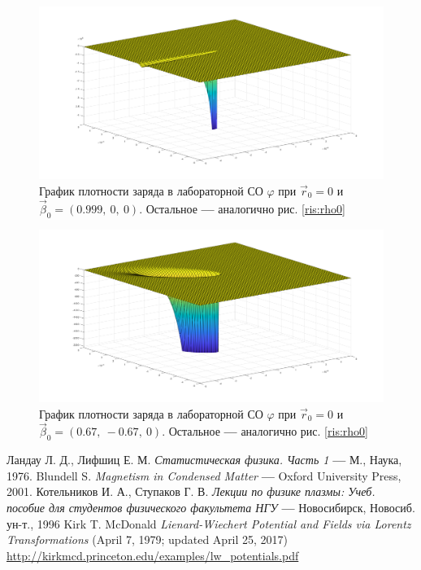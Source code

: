 \documentclass[oneside,final,14pt]{extarticle}
\begin{document}
	\begin{figure}
		\centering
		\includegraphics[scale=0.36]{spd0999orig.png}
		\caption{График плотности заряда в лабораторной СО $\varphi$ при $\vec r_{0}=0$ и $\vec \beta_0 = (0.999, \ 0, \ 0)$. Остальное \textbf{---} аналогично рис. \ref{ris:rho0}}
		\label{ris:rho0999}
	\end{figure}
	
	\begin{figure}
		\centering
		\includegraphics[scale=0.36]{diagspd095orig.png}
		\caption{График плотности заряда в лабораторной СО $\varphi$ при $\vec r_{0}=0$ и $\vec \beta_0 = (0.67, \ -0.67, \ 0)$. Остальное \textbf{---} аналогично рис. \ref{ris:rho0}}
		\label{ris:rho095diag}
	\end{figure}
	
	\newpage
	\begin{thebibliography}{0}
		 Ландау Л. Д., Лифшиц Е. М. \textit{Статистическая физика. Часть 1} \textbf{---} М., Наука, 1976.
		 Blundell S. \textit{Magnetism in Condensed Matter} \textbf{---} Oxford University Press, 2001.
		 Котельников И. А., Ступаков Г. В. \textit{Лекции по физике плазмы: Учеб. пособие для студентов физического факультета НГУ} \textbf{---} Новосибирск, Новосиб. ун-т., 1996
		 Kirk T. McDonald \textit{Lienard-Wiechert Potential and Fields via Lorentz Transformations} (April 7, 1979; updated April 25, 2017) \\ \url{http://kirkmcd.princeton.edu/examples/lw_potentials.pdf}
	\end{thebibliography}
\end{document}
